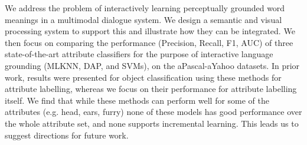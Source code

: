 We address the problem of interactively learning perceptually grounded word meanings in a multimodal dialogue system. We design a semantic and visual processing system to support this and illustrate how they can be integrated. We then focus on comparing the performance (Precision, Recall, F1, AUC) of three state-of-the-art attribute classifiers for the purpose of interactive language grounding (MLKNN, DAP, and SVMs), on the aPascal-aYahoo datasets. In prior work, results were presented for object classification using these methods for attribute labelling, whereas we focus on their performance for attribute labelling itself. We find that while these methods can perform well for some of the attributes (e.g. head, ears, furry) none of these models has good performance over the whole attribute set, and none supports incremental learning. This leads us to suggest directions for future work.
